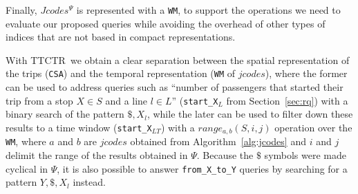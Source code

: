 \documentclass[runningheads]{llncs}
\newcommand{\ttctr}{TTCTR}
\begin{document}


Finally, $Jcodes^{\Psi}$ is represented with a \texttt{WM}, to support the operations we need to evaluate our proposed queries while avoiding the overhead of other types of indices that are not based in compact representations.

With \ttctr~we obtain a clear separation between the spatial representation of the trips (\texttt{CSA}) and the temporal representation (\texttt{WM} of $jcodes$), where the former can be used to address queries such as ``number of passengers that started their trip from a stop $X\in S$ and a line $l\in L$'' (\texttt{start\_X$_{L}$} from Section~\ref{sec:rq}) with a binary search of the pattern $\$,X_l$, while the later can be used to filter down these results to a time window (\texttt{start\_X$_{LT}$}) with a $range_{a,b}(S,i,j)$ operation over the \texttt{WM}, where $a$ and $b$ are $jcodes$ obtained from Algorithm~\ref{alg:jcodes} and $i$ and $j$ delimit the range of the results obtained in $\Psi$. Because the $\$$ symbols were made cyclical in $\Psi$, it is also possible to answer \texttt{from\_X\_to\_Y} queries by searching for a pattern $Y,\$,X_l$ instead.
\end{document}

